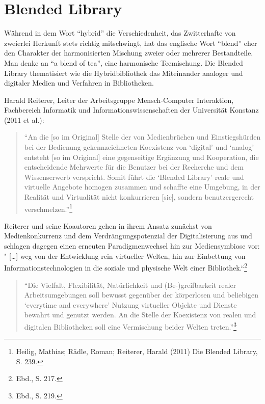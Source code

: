 \documentclass[a4paper,
fontsize=11pt,
oneside,
numbers=noperiodatend,
parskip=half-,
bibliography=totoc,
final
]{scrartcl}
\begin{document}
\section*{Blended Library}\label{blended-library}

Während in dem Wort \enquote{hybrid} die Verschiedenheit, das
Zwitterhafte von zweierlei Herkunft stets richtig mitschwingt, hat das
englische Wort \enquote{blend} eher den Charakter der harmonisierten
Mischung zweier oder mehrerer Bestandteile. Man denke an \enquote{a
blend of tea}, eine harmonische Teemischung. Die Blended Library
thematisiert wie die Hybridbibliothek das Miteinander analoger und
digitaler Medien und Verfahren in Bibliotheken.

Harald Reiterer, Leiter der Arbeitsgruppe Mensch-Computer Interaktion,
Fachbereich Informatik und Informationswissenschaften der Universität
Konstanz (2011 et al.):

\begin{quote}
\enquote{An die {[}so im Original{]} Stelle der von Medienbrüchen und
Einstiegshürden bei der Bedienung gekennzeichneten Koexistenz von
\enquote{digital} und \enquote{analog} entsteht {[}so im Original{]}
eine gegenseitige Ergänzung und Kooperation, die entscheidende Mehrwerte
für die Benutzer bei der Recherche und dem Wissenserwerb verspricht.
Somit führt die \enquote{Blended Library} reale und virtuelle Angebote
homogen zusammen und schaffte eine Umgebung, in der Realität und
Virtualität nicht konkurrieren {[}sic{]}, sondern benutzergerecht
verschmelzen.}\footnote{Heilig, Mathias; Rädle, Roman; Reiterer, Harald
  (2011) Die Blended Library, S. 239.}
\end{quote}

Reiterer und seine Koautoren gehen in ihrem Ansatz zunächst von
Medienkonkurrenz und dem Verdrängungspotenzial der Digitalisierung aus
und schlagen dagegen einen erneuten Paradigmenwechsel hin zur
Mediensymbiose vor: " {[}\ldots{}{]} weg von der Entwicklung rein
virtueller Welten, hin zur Einbettung von Informationstechnologien in
die soziale und physische Welt einer Bibliothek.``\footnote{Ebd., S.
  217.}

\begin{quote}
\enquote{Die Vielfalt, Flexibilität, Natürlichkeit und (Be-)greifbarkeit
realer Arbeitsumgebungen soll bewusst gegenüber der körperlosen und
beliebigen \enquote{everytime and everywhere} Nutzung virtueller Objekte
und Dienste bewahrt und genutzt werden. An die Stelle der Koexistenz von
realen und digitalen Bibliotheken soll eine Vermischung beider Welten
treten.}\footnote{Ebd., S. 219.}
\end{quote}
\end{document}
